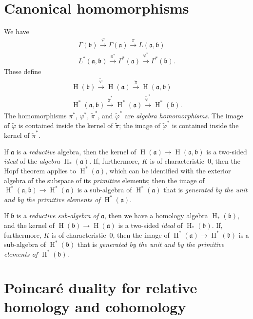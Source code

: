 \documentclass{article}
\newcommand{\fk}{\mathfrak}
\DeclareMathOperator{\HH}{H}
\newcommand{\oldpage}[1]{\marginpar{\footnotesize$\Big\vert$ \textit{p.~#1}}}
\begin{document}
\section{Canonical homomorphisms}
\label{III.2}

We have
\[
  \begin{gathered}
    \Gamma(\fk{b}) \xrightarrow{\varphi} \Gamma(\fk{a}) \xrightarrow{\pi} L(\fk{a},\fk{b})
  \\L^*(\fk{a},\fk{b}) \xrightarrow{\pi^*} \Gamma^*(\fk{a}) \xrightarrow{\varphi^*} \Gamma^*(\fk{b}).
  \end{gathered}
\]
These define
\oldpage{73}
\[
  \begin{gathered}
    \HH(\fk{b}) \xrightarrow{\widetilde{\varphi}} \HH(\fk{a}) \xrightarrow{\widetilde{\pi}} \HH(\fk{a},\fk{b})
  \\\HH^*(\fk{a},\fk{b}) \xrightarrow{\widetilde{\pi}^*} \HH^*(\fk{a}) \xrightarrow{\widetilde{\varphi}^*} \HH^*(\fk{b}).
  \end{gathered}
\]
The homomorphisms $\pi^*$, $\varphi^*$, $\widetilde{\pi}^*$, and $\widetilde{\varphi}^*$ are \emph{algebra homomorphisms}.
The image of $\widetilde{\varphi}$ is contained inside the kernel of $\widetilde{\pi}$;
the image of $\widetilde{\varphi}^*$ is contained inside the kernel of $\widetilde{\pi}^*$.

If $\fk{a}$ is a \emph{reductive} algebra, then the kernel of $\HH(\fk{a})\to\HH(\fk{a},\fk{b})$ is a two-sided \emph{ideal} of the \emph{algebra} $\HH_*(\fk{a})$.
If, furthermore, $K$ is of characteristic~$0$, then the Hopf theorem applies to $\HH^*(\fk{a})$, which can be identified with the exterior algebra of the subspace of its \emph{primitive} elements;
then the image of $\HH^*(\fk{a},\fk{b})\to\HH^*(\fk{a})$ is a sub-algebra of $\HH^*(\fk{a})$ that is \emph{generated by the unit and by the primitive elements of $\HH^*(\fk{a})$}.

If $\fk{b}$ is a \emph{reductive sub-algebra of $\fk{a}$}, then we have a homology algebra $\HH_*(\fk{b})$, and the kernel of $\HH(\fk{b})\to\HH(\fk{a})$ is a two-sided \emph{ideal} of $\HH_*(\fk{b})$.
If, furthermore, $K$ is of characteristic~$0$, then the image of $\HH^*(\fk{a})\to\HH^*(\fk{b})$ is a sub-algebra of $\HH^*(\fk{b})$ that is \emph{generated by the unit and by the primitive elements of $\HH^*(\fk{b})$}.


\section{Poincar\'{e} duality for relative homology and cohomology}
\label{III.3}
\end{document}
